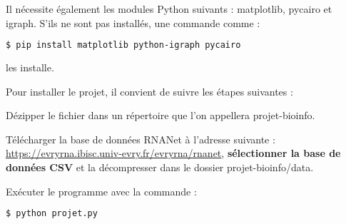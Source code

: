 \documentclass[11pt,a4paper]{article}
\begin{document}
\noindent Il nécessite également les modules Python suivants : matplotlib, pycairo et igraph. S'ils ne sont pas installés, une commande comme :
\begin{lstlisting}[language=Bash]
$ pip install matplotlib python-igraph pycairo
\end{lstlisting}
les installe. \eb

Pour installer le projet, il convient de suivre les étapes suivantes :
\bn \item Dézipper le fichier dans un répertoire que l'on appellera projet-bioinfo.
\item Télécharger la base de données RNANet à l'adresse suivante : \url{https://evryrna.ibisc.univ-evry.fr/evryrna/rnanet}, {\color{blue} \textbf{sélectionner la base de données CSV}} et la décompresser dans le dossier projet-bioinfo/data.
\item Exécuter le programme avec la commande :
\begin{lstlisting}[language=Bash]
$ python projet.py
\end{lstlisting} \en
\end{document}
